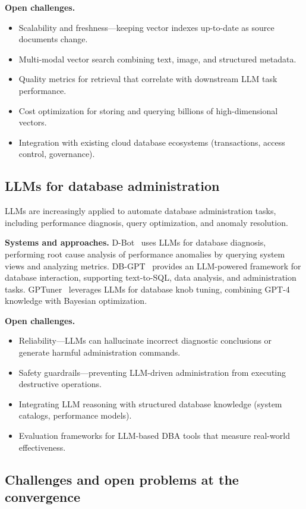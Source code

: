\documentclass[a4paper,fleqn]{cas-sc}
\begin{document}
\textbf{Open challenges.}
\begin{itemize}
    \item Scalability and freshness---keeping vector indexes up-to-date as source documents change.
    \item Multi-modal vector search combining text, image, and structured metadata.
    \item Quality metrics for retrieval that correlate with downstream LLM task performance.
    \item Cost optimization for storing and querying billions of high-dimensional vectors.
    \item Integration with existing cloud database ecosystems (transactions, access control, governance).
\end{itemize}

\subsection{LLMs for database administration}
\label{subsec:llmdba}

LLMs are increasingly applied to automate database administration tasks, including performance diagnosis, query optimization, and anomaly resolution.

\textbf{Systems and approaches.} D-Bot~\cite{Zhou2024DBot} uses LLMs for database diagnosis, performing root cause analysis of performance anomalies by querying system views and analyzing metrics. DB-GPT~\cite{Xue2024DBGPT} provides an LLM-powered framework for database interaction, supporting text-to-SQL, data analysis, and administration tasks. GPTuner~\cite{Lao2024GPTuner} leverages LLMs for database knob tuning, combining GPT-4 knowledge with Bayesian optimization.

\textbf{Open challenges.}
\begin{itemize}
    \item Reliability---LLMs can hallucinate incorrect diagnostic conclusions or generate harmful administration commands.
    \item Safety guardrails---preventing LLM-driven administration from executing destructive operations.
    \item Integrating LLM reasoning with structured database knowledge (system catalogs, performance models).
    \item Evaluation frameworks for LLM-based DBA tools that measure real-world effectiveness.
\end{itemize}

\subsection{Challenges and open problems at the convergence}
\label{subsec:llmchallenges}
\end{document}
